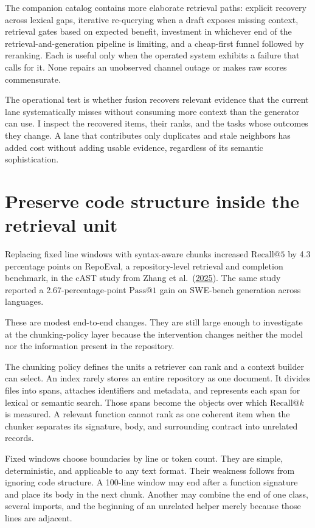The companion catalog contains more elaborate retrieval paths: explicit recovery across lexical gaps, iterative re-querying when a draft exposes missing context, retrieval gates based on expected benefit, investment in whichever end of the retrieval-and-generation pipeline is limiting, and a cheap-first funnel followed by reranking. Each is useful only when the operated system exhibits a failure that calls for it. None repairs an unobserved channel outage or makes raw scores commensurate.

The operational test is whether fusion recovers relevant evidence that the current lane systematically misses without consuming more context than the generator can use. I inspect the recovered items, their ranks, and the tasks whose outcomes they change. A lane that contributes only duplicates and stale neighbors has added cost without adding usable evidence, regardless of its semantic sophistication.

\hypertarget{preserve-code-structure-inside-the-retrieval-unit}{%
\section{Preserve code structure inside the retrieval unit}\label{preserve-code-structure-inside-the-retrieval-unit}}

Replacing fixed line windows with syntax-aware chunks increased \(\mathrm{Recall}@5\) by 4.3 percentage points on RepoEval, a repository-level retrieval and completion benchmark, in the cAST study from Zhang et al.~(\href{https://arxiv.org/abs/2506.15655}{2025}). The same study reported a 2.67-percentage-point \(\mathrm{Pass}@1\) gain on SWE-bench generation across languages.

These are modest end-to-end changes. They are still large enough to investigate at the chunking-policy layer because the intervention changes neither the model nor the information present in the repository.

The chunking policy defines the units a retriever can rank and a context builder can select. An index rarely stores an entire repository as one document. It divides files into spans, attaches identifiers and metadata, and represents each span for lexical or semantic search. Those spans become the objects over which \(\mathrm{Recall}@k\) is measured. A relevant function cannot rank as one coherent item when the chunker separates its signature, body, and surrounding contract into unrelated records.

Fixed windows choose boundaries by line or token count. They are simple, deterministic, and applicable to any text format. Their weakness follows from ignoring code structure. A 100-line window may end after a function signature and place its body in the next chunk. Another may combine the end of one class, several imports, and the beginning of an unrelated helper merely because those lines are adjacent.

